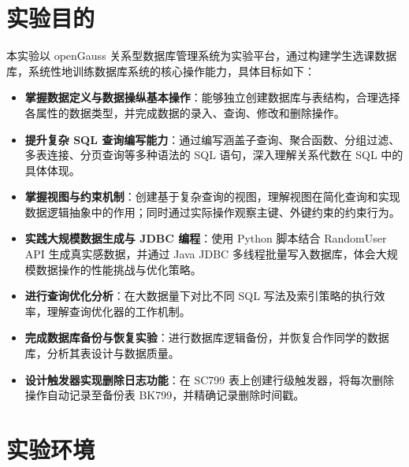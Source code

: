 \documentclass[12pt,a4paper]{ctexart}
\title{\reporttitle}
\author{\authname：\underline{李祥熙} \quad \authid：\underline{2234412799} \quad \class：\underline{计算机2301}}
\date{\today}
\begin{document}
\maketitle
\tableofcontents
\newpage

\section{实验目的}

本实验以 openGauss 关系型数据库管理系统为实验平台，通过构建学生选课数据库，系统性地训练数据库系统的核心操作能力，具体目标如下：

\begin{itemize}
  \item \textbf{掌握数据定义与数据操纵基本操作}：能够独立创建数据库与表结构，合理选择各属性的数据类型，并完成数据的录入、查询、修改和删除操作。
  \item \textbf{提升复杂 SQL 查询编写能力}：通过编写涵盖子查询、聚合函数、分组过滤、多表连接、分页查询等多种语法的 SQL 语句，深入理解关系代数在 SQL 中的具体体现。
  \item \textbf{掌握视图与约束机制}：创建基于复杂查询的视图，理解视图在简化查询和实现数据逻辑抽象中的作用；同时通过实际操作观察主键、外键约束的约束行为。
  \item \textbf{实践大规模数据生成与 JDBC 编程}：使用 Python 脚本结合 RandomUser API 生成真实感数据，并通过 Java JDBC 多线程批量写入数据库，体会大规模数据操作的性能挑战与优化策略。
  \item \textbf{进行查询优化分析}：在大数据量下对比不同 SQL 写法及索引策略的执行效率，理解查询优化器的工作机制。
  \item \textbf{完成数据库备份与恢复实验}：进行数据库逻辑备份，并恢复合作同学的数据库，分析其表设计与数据质量。
  \item \textbf{设计触发器实现删除日志功能}：在 SC799 表上创建行级触发器，将每次删除操作自动记录至备份表 BK799，并精确记录删除时间戳。
\end{itemize}

\section{实验环境}
\end{document}
